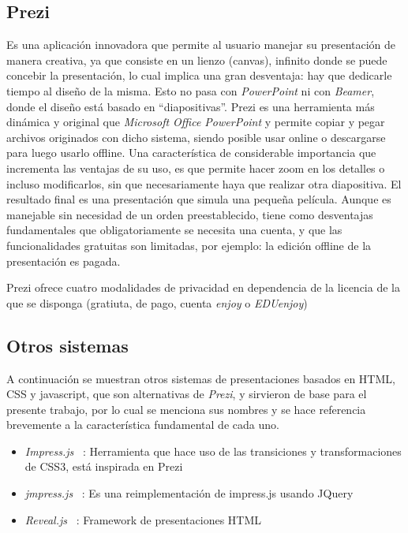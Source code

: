 
		\subsection{Prezi} %
		\label{sub:prezi}

			Es una aplicación innovadora que permite al usuario manejar su presentación de manera creativa, ya que consiste en un lienzo (canvas), infinito donde se puede concebir la presentación, lo cual implica una gran desventaja: hay que dedicarle tiempo al diseño de la misma. Esto no pasa con \textit{PowerPoint} ni con \textit{Beamer}, donde el diseño está basado en ``diapositivas''. Prezi es una herramienta más dinámica y original que \textit{Microsoft Office PowerPoint} y permite copiar y pegar archivos originados con dicho sistema, siendo posible usar online o descargarse para luego usarlo offline.  Una característica de considerable importancia que incrementa las ventajas de su uso, es que permite hacer zoom en los detalles o incluso modificarlos, sin que necesariamente haya que realizar otra diapositiva. El resultado final es una presentación que simula una pequeña película. Aunque es manejable sin necesidad de un orden preestablecido, tiene como desventajas fundamentales que obligatoriamente se necesita una cuenta, y que las funcionalidades gratuitas son limitadas, por ejemplo: la edición offline de la presentación es pagada.

			Prezi ofrece cuatro modalidades de privacidad en dependencia de la licencia de la que se disponga (gratiuta, de pago, cuenta \textit{enjoy} o \textit{EDUenjoy})		


		\subsection{Otros sistemas} %
		\label{sub:otros_sistemas}
			A continuación se muestran otros sistemas de presentaciones basados en HTML, CSS y javascript, que son alternativas de \textit{Prezi}, y sirvieron de base para el presente trabajo, por lo cual se menciona sus nombres y se hace referencia brevemente a la característica fundamental de cada uno.
			\begin{itemize}
				\item \textit{Impress.js} ~\cite{impress}: Herramienta que hace uso de las transiciones y transformaciones de CSS3, está inspirada en Prezi
				\item \textit{jmpress.js} ~\cite{jmpress}: Es una reimplementación de impress.js usando JQuery
				\item \textit{Reveal.js} ~\cite{reveal}: Framework de presentaciones HTML
			\end{itemize}
	
